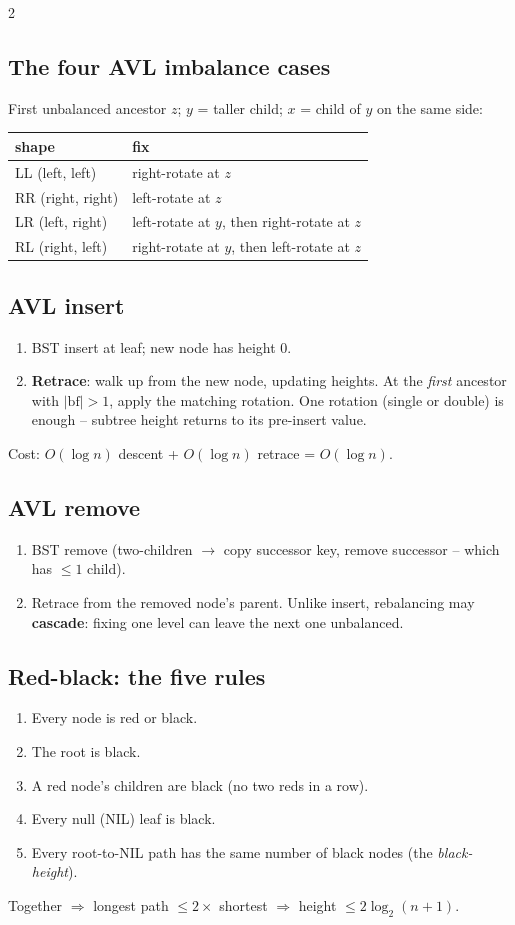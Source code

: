 \documentclass[10pt]{article}
\begin{document}
\begin{multicols}{2}
\subsection*{The four AVL imbalance cases}
First unbalanced ancestor $z$; $y$ = taller child; $x$ = child of $y$
on the same side:
\begin{tabular}{@{}l|l@{}}
\textbf{shape} & \textbf{fix}\\
\hline
LL (left, left)  & right-rotate at $z$\\
RR (right, right)& left-rotate at $z$\\
LR (left, right) & left-rotate at $y$, then right-rotate at $z$\\
RL (right, left) & right-rotate at $y$, then left-rotate at $z$
\end{tabular}

\subsection*{AVL insert}
\begin{enumerate}
    \item BST insert at leaf; new node has height 0.
    \item \textbf{Retrace}: walk up from the new node, updating
    heights. At the \emph{first} ancestor with $|\mathrm{bf}| > 1$,
    apply the matching rotation. One rotation (single or double) is
    enough -- subtree height returns to its pre-insert value.
\end{enumerate}
Cost: $O(\log n)$ descent + $O(\log n)$ retrace = $O(\log n)$.

\columnbreak

\subsection*{AVL remove}
\begin{enumerate}
    \item BST remove (two-children $\to$ copy successor key, remove
    successor -- which has $\le 1$ child).
    \item Retrace from the removed node's parent. Unlike insert,
    rebalancing may \textbf{cascade}: fixing one level can leave the
    next one unbalanced.
\end{enumerate}

\subsection*{Red-black: the five rules}
\begin{enumerate}
    \item Every node is red or black.
    \item The root is black.
    \item A red node's children are black (no two reds in a row).
    \item Every null (NIL) leaf is black.
    \item Every root-to-NIL path has the same number of black nodes
    (the \emph{black-height}).
\end{enumerate}
Together $\Rightarrow$ longest path $\le 2 \times$ shortest $\Rightarrow$
height $\le 2 \log_2(n+1)$.


\end{multicols}
\end{document}
